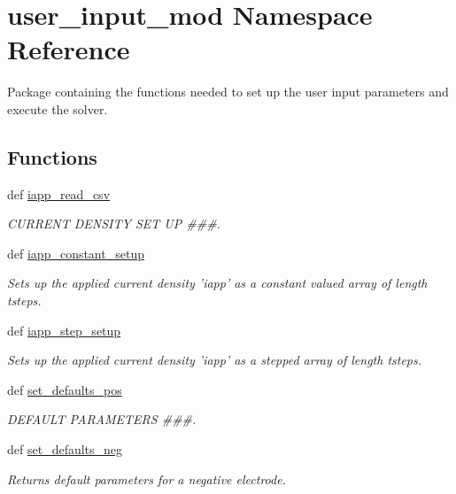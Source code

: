 \hypertarget{namespaceuser__input__mod}{\section{user\-\_\-input\-\_\-mod Namespace Reference}
\label{namespaceuser__input__mod}
}


Package containing the functions needed to set up the user input parameters and execute the solver.  


\subsection*{Functions}
\begin{DoxyCompactItemize}
\item 
def \hyperlink{namespaceuser__input__mod_a369d3751a2635edf6aca47c76e32a379}{iapp\-\_\-read\-\_\-csv}
\begin{DoxyCompactList}\small\item\em C\-U\-R\-R\-E\-N\-T D\-E\-N\-S\-I\-T\-Y S\-E\-T U\-P \#\#\#. \end{DoxyCompactList}\item 
def \hyperlink{namespaceuser__input__mod_ab782193387e8c3992d11b979bda4ddb7}{iapp\-\_\-constant\-\_\-setup}
\begin{DoxyCompactList}\small\item\em Sets up the applied current density 'iapp' as a constant valued array of length tsteps. \end{DoxyCompactList}\item 
def \hyperlink{namespaceuser__input__mod_a2511b60d779c810e395c24628cc22f6c}{iapp\-\_\-step\-\_\-setup}
\begin{DoxyCompactList}\small\item\em Sets up the applied current density 'iapp' as a stepped array of length tsteps. \end{DoxyCompactList}\item 
def \hyperlink{namespaceuser__input__mod_acef497295190e3914f7cd93da2708856}{set\-\_\-defaults\-\_\-pos}
\begin{DoxyCompactList}\small\item\em D\-E\-F\-A\-U\-L\-T P\-A\-R\-A\-M\-E\-T\-E\-R\-S \#\#\#. \end{DoxyCompactList}\item 
def \hyperlink{namespaceuser__input__mod_ad783135a051fdfddaadb06394ff84a73}{set\-\_\-defaults\-\_\-neg}
\begin{DoxyCompactList}\small\item\em Returns default parameters for a negative electrode. \end{DoxyCompactList}\item 

\end{DoxyCompactItemize}
